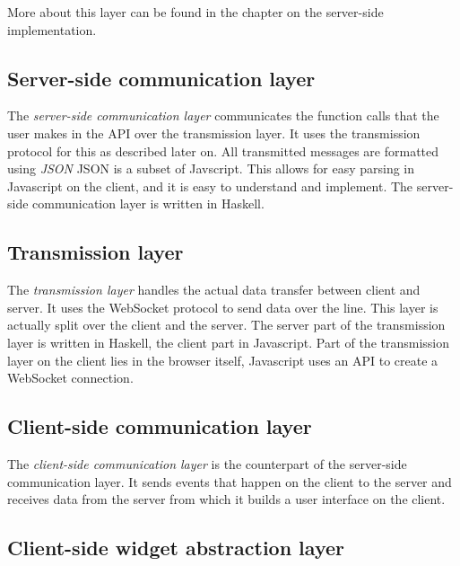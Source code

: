 \documentclass[11pt,a4paper]{article}
\begin{document}
More about this layer can be found in the chapter on the server-side implementation.

\subsection{Server-side communication layer}
The \textit{server-side communication layer} communicates the function calls that the user makes in the API over the transmission layer.
It uses the transmission protocol for this as described later on.
All transmitted messages are formatted using \textit{JSON}
JSON is a subset of Javscript.
This allows for easy parsing in Javascript on the client, and it is easy to understand and implement.
The server-side communication layer is written in Haskell.

\subsection{Transmission layer}

The \textit{transmission layer} handles the actual data transfer between client and server.
It uses the WebSocket protocol to send data over the line.
This layer is actually split over the client and the server.
The server part of the transmission layer is written in Haskell, the client part in Javascript.
Part of the transmission layer on the client lies in the browser itself, Javascript uses an API to create a WebSocket connection.


\subsection{Client-side communication layer}

The \textit{client-side communication layer} is the counterpart of the server-side communication layer.
It sends events that happen on the client to the server and receives data from the server from which it builds a user interface on the client.

\subsection{Client-side widget abstraction layer}
\end{document}
